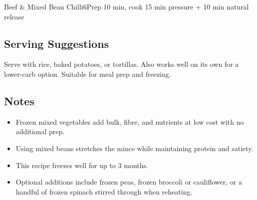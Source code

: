 \begin{recipebox}{Beef \& Mixed Bean Chilli}{6}{Prep 10 min, cook 15 min pressure + 10 min natural release}
\subsection*{Serving Suggestions}
Serve with rice, baked potatoes, or tortillas. Also works well on its own for a lower-carb option. Suitable for meal prep and freezing.

\subsection*{Notes}
\begin{itemize}
    \item Frozen mixed vegetables add bulk, fibre, and nutrients at low cost with no additional prep.
    \item Using mixed beans stretches the mince while maintaining protein and satiety.
    \item This recipe freezes well for up to 3 months.
    \item Optional additions include frozen peas, frozen broccoli or cauliflower, or a handful of frozen spinach stirred through when reheating.
\end{itemize}
\end{recipebox}
